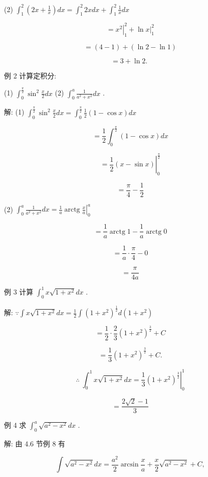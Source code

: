 \documentclass[10pt]{article}
\begin{document}
(2) \({\int }_{1}^{2}\left( {{2x} + \frac{1}{x}}\right) {dx} = {\int }_{1}^{2}{2xdx} + {\int }_{1}^{2}\frac{1}{x}{dx}\)

\[
= {\left. {x}^{2}\right| }_{1}^{2} + {\left. \ln x\right| }_{1}^{2}
\]

\[
= \left( {4 - 1}\right) + \left( {\ln 2 - \ln 1}\right)
\]

\[
= 3 + \ln 2\text{. }
\]

例 2 计算定积分:

(1) \({\int }_{0}^{\frac{\pi }{2}}{\sin }^{2}\frac{x}{2}{dx}\) (2) \({\int }_{0}^{a}\frac{1}{{a}^{2} + {x}^{2}}{dx}\) .

解: (1) \({\int }_{0}^{\frac{\pi }{2}}{\sin }^{2}\frac{x}{2}{dx} = {\int }_{0}^{\frac{\pi }{2}}\frac{1}{2}\left( {1 - \cos x}\right) {dx}\)

\[
= \frac{1}{2}{\int }_{0}^{\frac{\pi }{2}}\left( {1 - \cos x}\right) {dx}
\]

\[
= {\left. \frac{1}{2}\left( x - \sin x\right) \right| }_{0}^{\frac{\pi }{2}}
\]

\[
= \frac{\pi }{4} - \frac{1}{2}
\]

(2) \({\int }_{0}^{a}\frac{1}{{a}^{2} + {x}^{2}}{dx} = {\left. \frac{1}{a}\operatorname{arctg}\frac{x}{a}\right| }_{0}^{a}\)

\[
= \frac{1}{a}\operatorname{arctg}1 - \frac{1}{a}\operatorname{arctg}0
\]

\[
= \frac{1}{a} \cdot \frac{\pi }{4} - 0
\]

\[
= \frac{\pi }{4a}
\]

例 3 计算 \({\int }_{0}^{1}x\sqrt{1 + {x}^{2}}{dx}\) .

解: \(\because \int x\sqrt{1 + {x}^{2}}{dx} = \frac{1}{2}\int {\left( 1 + {x}^{2}\right) }^{\frac{1}{2}}d\left( {1 + {x}^{2}}\right)\)

\[
= \frac{1}{2} \cdot \frac{2}{3}{\left( 1 + {x}^{2}\right) }^{\frac{3}{2}} + C
\]

\[
= \frac{1}{3}{\left( 1 + {x}^{2}\right) }^{\frac{3}{2}} + C\text{.}
\]

\[
\therefore \;{\int }_{0}^{1}x\sqrt{1 + {x}^{2}}{dx} = {\left. \frac{1}{3}{\left( 1 + {x}^{2}\right) }^{\frac{3}{2}}\right| }_{0}^{1}
\]

\[
= \frac{2\sqrt{2} - 1}{3}
\]

例 4 求 \({\int }_{0}^{a}\sqrt{{a}^{2} - {x}^{2}}{dx}\) .

解: 由 4.6 节例 8 有

\[
\int \sqrt{{a}^{2} - {x}^{2}}{dx} = \frac{{a}^{2}}{2}\arcsin \frac{x}{a} + \frac{x}{2}\sqrt{{a}^{2} - {x}^{2}} + C,
\]
\end{document}
